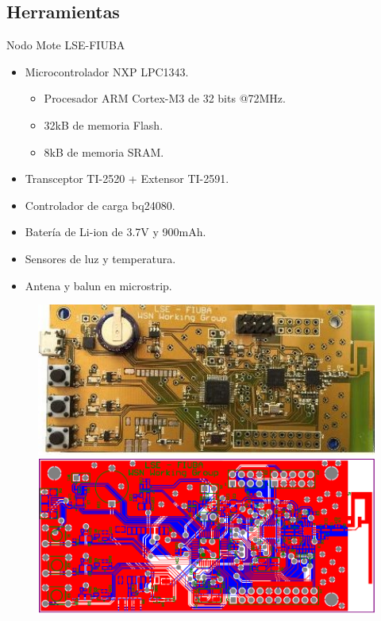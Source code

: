 \documentclass[aspectratio=169, handout]{beamer}
\begin{document}
\subsection[Herramientas]{Herramientas}
\begin{frame}{Nodo Mote LSE-FIUBA} 

\begin{minipage}[c]{1.0\linewidth}
	\begin{minipage}[c]{0.6\linewidth}
\begin{itemize}
\item Microcontrolador NXP LPC1343.
   \begin{itemize}
   \item Procesador ARM Cortex-M3 de 32 bits @72MHz. 
   \item 32kB de memoria Flash.
   \item 8kB de memoria SRAM.
   \end{itemize}
\item Transceptor TI-2520 + Extensor TI-2591.
\item Controlador de carga bq24080.
\item Batería de Li-ion de 3.7V y 900mAh.
\item Sensores de luz y temperatura.
\item Antena y balun en microstrip.
\end{itemize}
	\end{minipage}
	\begin{minipage}[c]{0.35\linewidth}
		\begin{figure}[H]
			\vspace{35px}
			\includegraphics[width=1.2\textwidth]{./imagenes/mote.jpg}
			\\
			\vspace{10px}
			\includegraphics[width=1.2\textwidth]{./imagenes/motePCB}

\end{figure}
\end{minipage}
\end{minipage}
\end{frame}
\end{document}
